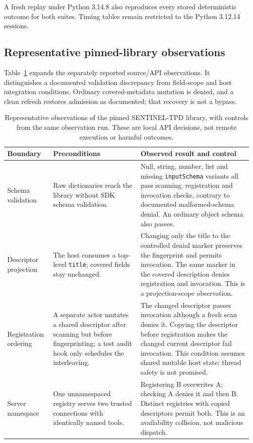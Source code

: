 A fresh replay under Python 3.14.8 also reproduces every stored deterministic outcome for both suites. Timing tables remain restricted to the Python 3.12.14 sessions.

\subsection{Representative pinned-library observations}
Table~\ref{tab:upstream} expands the separately reported source/API observations.
It distinguishes a documented validation discrepancy from field-scope and host
integration conditions. Ordinary covered-metadata mutation is denied, and a clean
refresh restores admission as documented; that recovery is not a bypass.

\begin{table}[t]
\caption{Representative observations of the pinned SENTINEL-TPD library, with
controls from the same observation run. These are local API decisions, not remote
execution or harmful outcomes.}
\label{tab:upstream}
\centering\small
\begin{tabular}{p{}p{}p{}}
\hline
Boundary & Preconditions & Observed result and control \\
\hline
Schema validation & Raw dictionaries reach the library without SDK schema validation. & Null, string, number, list and missing \texttt{inputSchema} variants all pass scanning, registration and invocation checks, contrary to documented malformed-schema denial. An ordinary object schema also passes. \\
Descriptor projection & The host consumes a top-level \texttt{title}; covered fields stay unchanged. & Changing only the title to the controlled denial marker preserves the fingerprint and permits invocation. The same marker in the covered description denies registration and invocation. This is a projection-scope observation. \\
Registration ordering & A separate actor mutates a shared descriptor after scanning but before fingerprinting; a test audit hook only schedules the interleaving. & The changed descriptor passes invocation although a fresh scan denies it. Copying the descriptor before registration makes the changed current descriptor fail invocation. This condition assumes shared mutable host state; thread safety is not promised. \\
Server namespace & One unnamespaced registry serves two trusted connections with identically named tools. & Registering B overwrites A; checking A denies it and then B. Distinct registries with copied descriptors permit both. This is an availability collision, not malicious dispatch. \\
\hline
\end{tabular}
\end{table}

